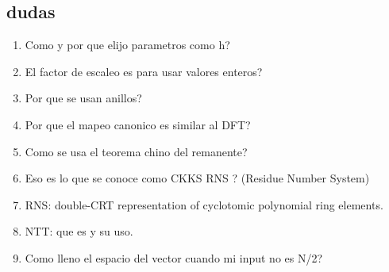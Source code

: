 \documentclass[12pt, oneside]{article}
\begin{document}
\subsection{dudas}
\begin{enumerate}
  \item Como y por que elijo parametros como h?
  \item El factor de escaleo es para usar valores enteros?
  \item Por que se usan anillos?
  \item Por que el mapeo canonico es similar al DFT?
  \item Como se usa el teorema chino del remanente?
  \item Eso es lo que se conoce como CKKS RNS ? (Residue Number System)
  \item RNS: double-CRT representation of cyclotomic polynomial ring elements.
  \item NTT: que es y su uso.
  \item Como lleno el espacio del vector cuando mi input no es N/2?
\end{enumerate}

\end{document}
